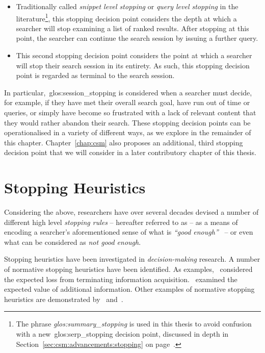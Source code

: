 \begin{itemize}
    \item[\blueboxbold{1}]{ Traditionally called \emph{snippet level stopping} or \emph{query level stopping} in the literature\footnote{The phrase \emph{\gls{glos:summary_stopping}} is used in this thesis to avoid confusion with a new~\gls{glos:serp_stopping} decision point, discussed in depth in Section~\ref{sec:csm:advancements:stopping} on page~\pageref{sec:csm:advancements:stopping}.}, this stopping decision point considers the depth at which a searcher will stop examining a list of ranked results. After stopping at this point, the searcher can continue the search session by issuing a further query.}
    \item[\blueboxbold{2}]{ This second stopping decision point considers the point at which a searcher will stop their search session in its entirety. As such, this stopping decision point is regarded as terminal to the search session.}
\end{itemize}

In particular,~\gls{glos:session_stopping} is considered when a searcher must decide, for example, if they have met their overall search goal, have run out of time or queries, or simply have become so frustrated with a lack of relevant content that they would rather abandon their search. These stopping decision points can be operationalised in a variety of different ways, as we explore in the remainder of this chapter. Chapter~\ref{chap:csm} also proposes an additional, third stopping decision point that we will consider in a later contributory chapter of this thesis.

\section{Stopping Heuristics}\label{sec:stopping_background:heuristics}
Considering the above, researchers have over several decades devised a number of different high level \emph{stopping rules} -- hereafter referred to as  -- as a means of encoding a searcher's aforementioned sense of what is \emph{``good enough''}~\citep{zach2005enough_is_enough} -- or even what can be considered as \emph{not good enough}.

Stopping heuristics have been investigated in \emph{decision-making} research. A number of normative stopping heuristics have been identified. As examples,~\cite{busemeyer1988deferred_decision_making} considered the expected loss from terminating information acquisition.~\cite{kogut1990sunk_costs} examined the expected value of additional information. Other examples of normative stopping heuristics are demonstrated by~\cite{pitz1969information_seeking} and~\cite{busemeyer1988deferred_decision_making}.

